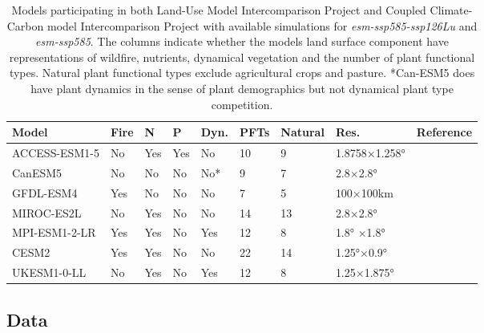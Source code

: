 \documentclass[]{article}
\begin{document}
\begin{table}[H]
    \centering
    \begin{tabular}{lllllllll}
        \hline
Model         & Fire & N   & P   & Dyn.  & PFTs     & Natural & Res.           & Reference                           \\ \hline
ACCESS-ESM1-5 & No   & Yes & Yes & No    & 10       & 9       & 1.8758×1.258°   & \cite{ziehn_australian_2020}   \\
CanESM5       & No   & No  & No  & No*   & 9        & 7       & 2.8×2.8°  & \cite{swart_canadian_2019}     \\
GFDL-ESM4     & Yes  & No  & No  & No    & 7        & 5       & 100×100km       & \cite{dunne_gfdl_2020}         \\
MIROC-ES2L    & No   & Yes & No  & No    & 14       & 13      & 2.8×2.8°        & \cite{hajima_development_2020} \\
MPI-ESM1-2-LR & Yes  & Yes & No  & Yes   & 12       & 8      & 1.8° ×1.8°       & \cite{mauritsen_developments_2019}  \\
CESM2         & Yes  & Yes & No  & No    & 22       & 14      & 1.25°×0.9°      & \cite{danabasoglu_community_2020} \\
UKESM1-0-LL   & No   & Yes & No  & Yes   & 12       & 8       & 1.25×1.875°     & \cite{sellar_ukesm1_2019}      \\ \hline
    \end{tabular}
    \caption{Models participating in both Land-Use Model Intercomparison Project and Coupled Climate-Carbon model Intercomparison Project with available simulations for \textit{esm-ssp585-ssp126Lu} and \textit{esm-ssp585}. The columns indicate whether the models land surface component have representations of wildfire, nutrients, dynamical vegetation and the number of plant functional types. Natural plant functional types exclude agricultural crops and pasture. *Can-ESM5 does have plant dynamics in the sense of plant demographics but not dynamical plant type competition.}
    \label{tab:models}
\end{table}

\subsection{Data}
\end{document}
